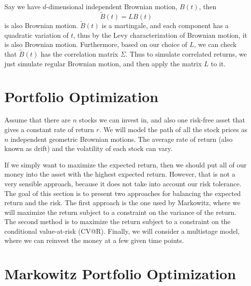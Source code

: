 \documentclass{amsart}
\theoremstyle{definition}
\theoremstyle{remark}
\begin{document}
Say we have $d$-dimensional independent Brownian motion, $B(t)$, then
\begin{equation*}
\tilde{B}(t) = LB(t)
\end{equation*}
is also Brownian motion. $\tilde{B}(t)$ is a martingale, and each component has a quadratic variation of $t$, thus by the Levy characterization of Brownian motion, it is also Brownian motion. Furthermore, based on our choice of $L$, we can check that  $\tilde{B}(t)$ has the correlation matrix $\Sigma$. Thus to simulate correlated returns, we just simulate regular Brownian motion, and then apply the matrix $L$ to it.
\section{Portfolio Optimization}
Assume that there are $n$ stocks we can invest in, and also one risk-free asset that gives a constant rate of return $r$. We will model the path of all the stock prices as $n$ independent geometric Brownian motions. The average rate of return (also known as drift) and the volatility of each stock can vary.

If we simply want to maximize the expected return, then we should put all of our money into the asset with the highest expected return. However, that is not a very sensible approach, because it does not take into account our risk tolerance. The goal of this section is to present two approaches for balancing the expected return and the risk. The first approach is the one used by Markowitz, where we will maximize the return subject to a constraint on the variance of the return. The second method is to maximize the return subject to a constraint on the conditional value-at-risk (CV@R). Finally, we will consider a multistage model, where we can reinvest the money at a few given time points.

\section{Markowitz Portfolio Optimization}
\end{document}
